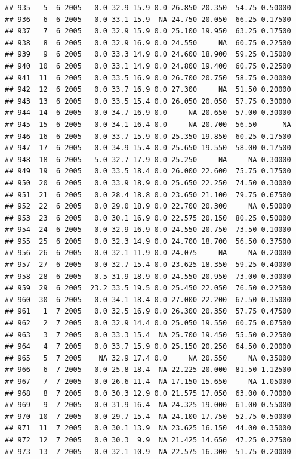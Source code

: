 \documentclass[
]{book}
\begin{document}
\begin{verbatim}
## 935   5  6 2005   0.0 32.9 15.9 0.0 26.850 20.350  54.75 0.50000
## 936   6  6 2005   0.0 33.1 15.9  NA 24.750 20.050  66.25 0.17500
## 937   7  6 2005   0.0 32.9 15.9 0.0 25.100 19.950  63.25 0.17500
## 938   8  6 2005   0.0 32.9 16.9 0.0 24.550     NA  60.75 0.22500
## 939   9  6 2005   0.0 33.3 14.9 0.0 24.600 18.900  59.25 0.15000
## 940  10  6 2005   0.0 33.1 14.9 0.0 24.800 19.400  60.75 0.22500
## 941  11  6 2005   0.0 33.5 16.9 0.0 26.700 20.750  58.75 0.20000
## 942  12  6 2005   0.0 33.7 16.9 0.0 27.300     NA  51.50 0.20000
## 943  13  6 2005   0.0 33.5 15.4 0.0 26.050 20.050  57.75 0.30000
## 944  14  6 2005   0.0 34.7 16.9 0.0     NA 20.650  57.00 0.30000
## 945  15  6 2005   0.0 34.1 16.4 0.0     NA 20.700  56.50      NA
## 946  16  6 2005   0.0 33.7 15.9 0.0 25.350 19.850  60.25 0.17500
## 947  17  6 2005   0.0 34.9 15.4 0.0 25.650 19.550  58.00 0.17500
## 948  18  6 2005   5.0 32.7 17.9 0.0 25.250     NA     NA 0.30000
## 949  19  6 2005   0.0 33.5 18.4 0.0 26.000 22.600  75.75 0.17500
## 950  20  6 2005   0.0 33.9 18.9 0.0 25.650 22.250  74.50 0.30000
## 951  21  6 2005   0.0 28.4 18.8 0.0 23.650 21.100  79.75 0.67500
## 952  22  6 2005   0.0 29.0 18.9 0.0 22.700 20.300     NA 0.50000
## 953  23  6 2005   0.0 30.1 16.9 0.0 22.575 20.150  80.25 0.50000
## 954  24  6 2005   0.0 32.9 16.9 0.0 24.550 20.750  73.50 0.10000
## 955  25  6 2005   0.0 32.3 14.9 0.0 24.700 18.700  56.50 0.37500
## 956  26  6 2005   0.0 32.1 11.9 0.0 24.075     NA     NA 0.20000
## 957  27  6 2005   0.0 32.7 15.4 0.0 23.625 18.350  59.25 0.40000
## 958  28  6 2005   0.5 31.9 18.9 0.0 24.550 20.950  73.00 0.30000
## 959  29  6 2005  23.2 33.5 19.5 0.0 25.450 22.050  76.50 0.22500
## 960  30  6 2005   0.0 34.1 18.4 0.0 27.000 22.200  67.50 0.35000
## 961   1  7 2005   0.0 32.5 16.9 0.0 26.300 20.350  57.75 0.47500
## 962   2  7 2005   0.0 32.9 14.4 0.0 25.050 19.550  60.75 0.07500
## 963   3  7 2005   0.0 33.3 15.4  NA 25.700 19.450  55.50 0.22500
## 964   4  7 2005   0.0 33.7 15.9 0.0 25.150 20.250  64.50 0.20000
## 965   5  7 2005    NA 32.9 17.4 0.0     NA 20.550     NA 0.35000
## 966   6  7 2005   0.0 25.8 18.4  NA 22.225 20.000  81.50 1.12500
## 967   7  7 2005   0.0 26.6 11.4  NA 17.150 15.650     NA 1.05000
## 968   8  7 2005   0.0 30.3 12.9 0.0 21.575 17.050  63.00 0.70000
## 969   9  7 2005   0.0 31.9 16.4  NA 24.325 19.000  61.00 0.55000
## 970  10  7 2005   0.0 29.7 15.4  NA 24.100 17.750  52.75 0.50000
## 971  11  7 2005   0.0 30.1 13.9  NA 23.625 16.150  44.00 0.35000
## 972  12  7 2005   0.0 30.3  9.9  NA 21.425 14.650  47.25 0.27500
## 973  13  7 2005   0.0 32.1 10.9  NA 22.575 16.300  51.75 0.20000

\end{verbatim}
\end{document}
